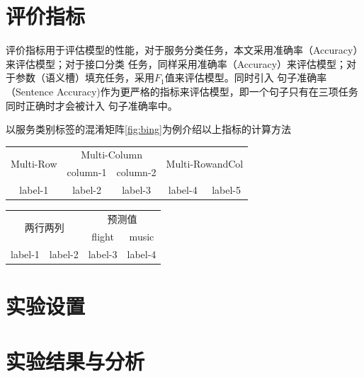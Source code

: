 \section{评价指标}
评价指标用于评估模型的性能，对于服务分类任务，本文采用准确率（Accuracy）来评估模型；对于接口分类
任务，同样采用准确率（Accuracy）来评估模型；对于参数（语义槽）填充任务，采用$F_1$值来评估模型。同时引入
句子准确率（Sentence Accuracy)作为更严格的指标来评估模型，即一个句子只有在三项任务同时正确时才会被计入
句子准确率中。

以服务类别标签的混淆矩阵\ref{fig:bing}为例介绍以上指标的计算方法

      


\begin{tabular}{|c|c|c|c|c|}
  \hline
  \multirow{2}{*}{Multi-Row}&
  \multicolumn{2}{c|}{Multi-Column}&
  \multicolumn{2}{c|}{\multirow{2}{*}{Multi-RowandCol}} \\
  \cline{2-3}
    & column-1&column-2 & \multicolumn{2}{c|}{}\\
  \hline
  label-1 & label-2&label-3 & label-4& label-5\\
  \hline
  \end{tabular}

  \begin{tabular}{|c|c|c|c|}
    \hline
    \multicolumn{2}{c|}{\multirow{2}{*}{两行两列}}&
    \multicolumn{2}{c|}{预测值}\\
    \cline{3-4}
     & &flight & music \\
     \hline
    label-1 & label-2&label-3 & label-4\\
    \hline
    \end{tabular}


    


\section{实验设置}

\section{实验结果与分析}